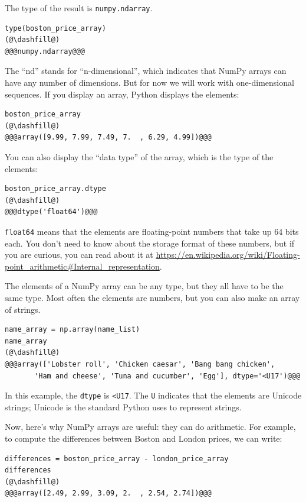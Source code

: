 The type of the result is \passthrough{\lstinline!numpy.ndarray!}.

\begin{lstlisting}[]
type(boston_price_array)
(@\dashfill@)
@@@numpy.ndarray@@@
\end{lstlisting}

The ``nd'' stands for ``n-dimensional'', which indicates that NumPy
arrays can have any number of dimensions. But for now we will work with
one-dimensional sequences. If you display an array, Python displays the
elements:

\begin{lstlisting}[]
boston_price_array
(@\dashfill@)
@@@array([9.99, 7.99, 7.49, 7.  , 6.29, 4.99])@@@
\end{lstlisting}

You can also display the ``data type'' of the array, which is the type
of the elements:

\begin{lstlisting}[]
boston_price_array.dtype
(@\dashfill@)
@@@dtype('float64')@@@
\end{lstlisting}

\passthrough{\lstinline!float64!} means that the elements are
floating-point numbers that take up 64 bits each. You don't need to know
about the storage format of these numbers, but if you are curious, you
can read about it at
\url{https://en.wikipedia.org/wiki/Floating-point_arithmetic\#Internal_representation}.

The elements of a NumPy array can be any type, but they all have to be
the same type. Most often the elements are numbers, but you can also
make an array of strings.

\begin{lstlisting}[]
name_array = np.array(name_list)
name_array
(@\dashfill@)
@@@array(['Lobster roll', 'Chicken caesar', 'Bang bang chicken',
       'Ham and cheese', 'Tuna and cucumber', 'Egg'], dtype='<U17')@@@
\end{lstlisting}

In this example, the \passthrough{\lstinline!dtype!} is
\passthrough{\lstinline!<U17!}. The \passthrough{\lstinline!U!}
indicates that the elements are Unicode strings; Unicode is the standard
Python uses to represent strings.

Now, here's why NumPy arrays are useful: they can do arithmetic. For
example, to compute the differences between Boston and London prices, we
can write:

\begin{lstlisting}[]
differences = boston_price_array - london_price_array
differences
(@\dashfill@)
@@@array([2.49, 2.99, 3.09, 2.  , 2.54, 2.74])@@@
\end{lstlisting}


